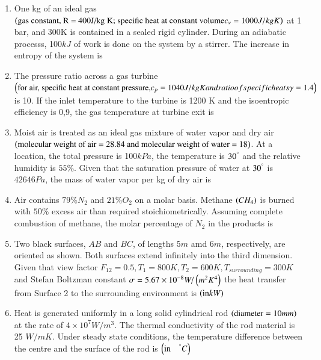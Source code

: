 \documentclass[journal,12pt,onecolumn]{IEEEtran}
\theoremstyle{remark}
\begin{document}
\begin{enumerate}
    \item One kg of an ideal gas $\left(\textnormal{gas constant, R = 400J/kg K; specific
        heat at constant volume} c_v = 1000 J/kg K\right)$ at 1 bar, and 300K is contained in a sealed rigid 
        cylinder. During an adiabatic processs, 100$kJ$ of work is done on the system by a stirrer. 
        The increase in entropy of the system is 
        \hfill{}
   \\     
    \item The pressure ratio across a gas turbine $\left(\text
        {for air, specific heat at constant pressure,}c_p = 1040J/kg K and ratio of specific heats \gamma = 1.4\right)$ is
        10. If the inlet temperature to the turbine is 1200 K and the isoentropic efficiency is 0,9, the gas 
        temperature at turbine exit is 
        \hfill{}
   \\     
        
    \item Moist air is treated as an ideal gas mixture of water vapor and dry air 
        $\left(\text{molecular weight of air = 28.84 and molecular weight of water = 18}\right)$. At a 
        location, the total pressure is 100$kPa$, the temperature is $30 ^{\degree}$ and the 
        relative humidity is $55\%$. Given that the saturation pressure of water at $30 ^{\degree}$
        is $42646 Pa$, the mass of water vapor per kg of dry air is
        \hfill{}
        

    \item Air contains $79\% N_2$ and $21 \% O_2$ on a molar basis. Methane $\left(CH_4\right)$ is 
        burned with $50\%$ excess air than required stoichiometrically. Assuming complete combustion 
        of methane, the molar percentage of $N_2$ in the products is
        \hfill{}
        
    \item Two black surfaces, $AB$ and $BC$, of lengths $5m$ amd $6m$, respectively, are oriented as shown.
        Both surfaces extend infinitely into the third dimension. Given that view factor 
        $F_{12} = 0.5, T_1 = 800K, T_2 = 600K, T_{surrounding} = 300K$ and Stefan Boltzman constant
        $\sigma = 5.67 \times 10^{-8} W/\left(m^2 K^4\right)$ the heat transfer from Surface 2 to the surrounding
        environment is $\left(\text{in} kW\right)$
        \hfill{}
        \begin{center}
            \resizebox{0.5\textwidth}{!}{
                
            } 
        \end{center} 
    \item Heat is generated uniformly in a long solid cylindrical rod $\left(\text{diameter} = 10mm\right)$
        at the rate of $4 \times 10^7 W/m^3$. The thermal conductivity of the rod material is 25 $W/m K$. Under
        steady state conditions, the temperature difference between the centre and the surface of the rod is
        $\left(\text{in} \quad^{\degree}C\right)$
        \hfill{}


\end{enumerate}
\end{document}
